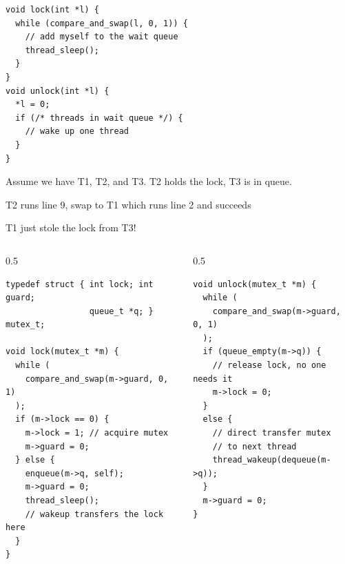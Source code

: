   \begin{slide}


	\vspace{-5mm}
	
    \begin{verbatim}
void lock(int *l) {
  while (compare_and_swap(l, 0, 1)) {
    // add myself to the wait queue
    thread_sleep();
  }
}
void unlock(int *l) {
  *l = 0;
  if (/* threads in wait queue */) {
    // wake up one thread
  }
}
    \end{verbatim}
    \medskip

    Assume we have T1, T2, and T3. T2 holds the lock, T3 is in queue.

    \leftspace{}T2 runs line 9, swap to T1 which runs line 2 and succeeds

    \leftspace{}\leftspace{}T1 just stole the lock from T3!
  \end{slide}

  \begin{slide}

	\vspace{-5mm}
	

    \begin{columns}
      \begin{column}{0.5\textwidth}
        \begin{verbatim}
typedef struct { int lock; int guard;
                 queue_t *q; } mutex_t;

void lock(mutex_t *m) {
  while (
    compare_and_swap(m->guard, 0, 1)
  );
  if (m->lock == 0) {
    m->lock = 1; // acquire mutex
    m->guard = 0;
  } else {
    enqueue(m->q, self);
    m->guard = 0;
    thread_sleep();
    // wakeup transfers the lock here
  }
}
        \end{verbatim}
      \end{column}
      \begin{column}{0.5\textwidth}
        \begin{verbatim}
void unlock(mutex_t *m) {
  while (
    compare_and_swap(m->guard, 0, 1)
  );
  if (queue_empty(m->q)) {
    // release lock, no one needs it
    m->lock = 0; 
  }
  else {
    // direct transfer mutex
    // to next thread
    thread_wakeup(dequeue(m->q));
  }
  m->guard = 0;
}
        \end{verbatim}
      \end{column}
    \end{columns}

  \end{slide}

